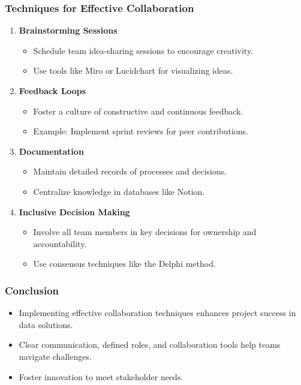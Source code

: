 \documentclass{beamer}
\begin{document}
\begin{frame}[fragile]
    \frametitle{Techniques for Effective Collaboration}
    \begin{enumerate}
        \item \textbf{Brainstorming Sessions}
            \begin{itemize}
                \item Schedule team idea-sharing sessions to encourage creativity.
                \item Use tools like Miro or Lucidchart for visualizing ideas.
            \end{itemize}
        \item \textbf{Feedback Loops}
            \begin{itemize}
                \item Foster a culture of constructive and continuous feedback.
                \item Example: Implement sprint reviews for peer contributions.
            \end{itemize}
        \item \textbf{Documentation}
            \begin{itemize}
                \item Maintain detailed records of processes and decisions.
                \item Centralize knowledge in databases like Notion.
            \end{itemize}
        \item \textbf{Inclusive Decision Making}
            \begin{itemize}
                \item Involve all team members in key decisions for ownership and accountability.
                \item Use consensus techniques like the Delphi method.
            \end{itemize}
    \end{enumerate}
\end{frame}

\begin{frame}
    \frametitle{Conclusion}
    \begin{itemize}
        \item Implementing effective collaboration techniques enhances project success in data solutions.
        \item Clear communication, defined roles, and collaboration tools help teams navigate challenges.
        \item Foster innovation to meet stakeholder needs.
    \end{itemize}
\end{frame}
\end{document}
